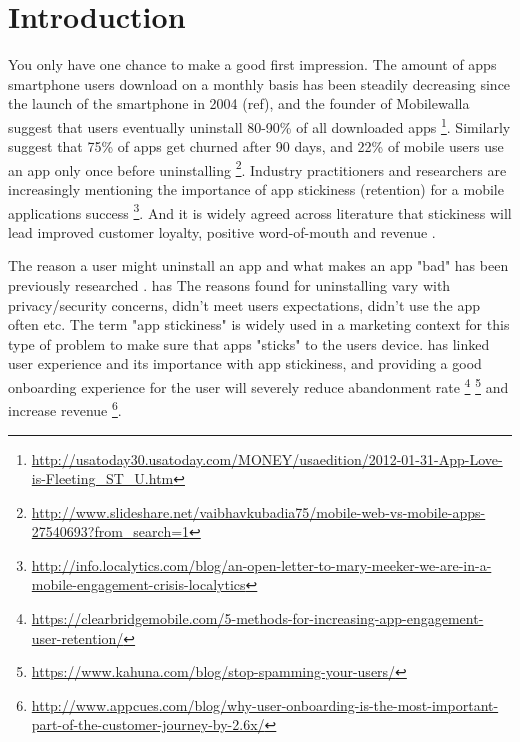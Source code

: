 \chapter{Introduction}
\label{chap:introduction}

You only have one chance to make a good first impression. The amount of apps smartphone users download on a monthly basis has been steadily decreasing since the launch of the smartphone in 2004 (ref), and the founder of Mobilewalla suggest that users eventually uninstall 80-90\% of all downloaded apps \footnote{\url{http://usatoday30.usatoday.com/MONEY/usaedition/2012-01-31-App-Love-is-Fleeting\_ST\_U.htm}}. Similarly \cite{Perro2016} suggest that 75\% of apps get churned after 90 days, and 22\% of mobile users use an app only once before uninstalling \footnote{\url{http://www.slideshare.net/vaibhavkubadia75/mobile-web-vs-mobile-apps-27540693?from_search=1}}. Industry practitioners and researchers are increasingly mentioning the importance of app stickiness (retention) for a mobile applications success \cite{Perro2016} \cite{IGIGlobal2016} \cite{Kim2016} \footnote{\url{http://info.localytics.com/blog/an-open-letter-to-mary-meeker-we-are-in-a-mobile-engagement-crisis-localytics}}. And it is widely agreed across literature that stickiness will lead improved customer loyalty, positive word-of-mouth and revenue \cite{Reichheld2000} \cite{Srinivasan2002} \cite{Hsu2016a}.

The reason a user might uninstall an app and what makes an app "bad" has been previously researched \cite{Lin2012} \cite{Shklovski} \cite{Song2014}. \cite{IGIGlobal2016} has  The reasons found for uninstalling vary with privacy/security concerns, didn't meet users expectations, didn't use the app often etc. The term "app stickiness" is widely used in a marketing context for this type of problem to make sure that apps "sticks" to the users device. \cite{IGIGlobal2016} has linked user experience and its importance with app stickiness, and providing a good onboarding experience for the user will severely reduce abandonment rate \footnote{\url{https://clearbridgemobile.com/5-methods-for-increasing-app-engagement-user-retention/}} \footnote{\url{https://www.kahuna.com/blog/stop-spamming-your-users/}} and increase revenue \footnote{\url{http://www.appcues.com/blog/why-user-onboarding-is-the-most-important-part-of-the-customer-journey-by-2.6x/}}.



